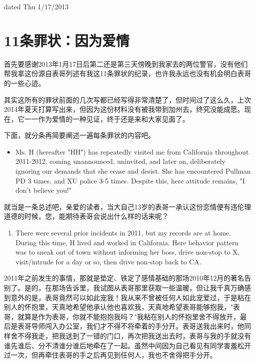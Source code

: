\documentclass[12pt]{book}
\begin{document}
dated Thu 1/17/2013

\section{11条罪状：因为爱情}
\label{sec-43-2}
首先要感谢2013年1月17日后第二还是第三天傍晚到我家去的两位警官，没有他们帮我拿这份源自表哥列述有我这11条罪状的纪录，也许我永远也没有机会明白表哥的一些心迹。

其实这所有的罪状前面的几次写都已经写得非常清楚了，但时间过了这么久，上次2014年夏天打算写出来，但因为这份材料没有被我带到加州去，终究没能成愿。现在，它一一作为爱情的一种见证，终于还是来和大家见面了。

下面，就分条再简要阐述一遍每条罪状的内容吧。

\begin{itemize}
\item Ms. H (hereafter "HH") has repeatedly visited me from California throughout 2011-2012, coming unannounced, uninvited, and later on, deliberately ignoring our demands that she cease and desist. She has encountered Pullman PD 3 times, and XU police 3-5 times. Despite this, here attitude remains, "I don't believe you!"
\end{itemize}

就当是一条总述吧，亲爱的读者，当大自己13岁的表哥一承认这份恋情便有违伦理道德的时候，您，能期待表哥会说出什么样的话来呢？

\begin{enumerate}
\item There were several prior incidents in 2011, but my records are at home. During this time, H lived and worked in California. Here behavior pattern was to sneak out of town without informing her boss, drive non-stop to X, visit/intrude for a day or so, then drive non-stop back to CA.
\end{enumerate}

2011年之前发生的事情，那就是垫定、铁定了感情基础的那场2010年12月的著名告别了。是的，在那场告诉里，我试图从表哥那里获取一些温暖，但让我千真万确感到意外的是，表哥竟然可以如此宠我！我从来不曾被任何人如此宠爱过，于是粘在别人的怀抱里，天真地希望他承认他也喜欢我，天真地希望表哥能够抱我，"表哥，就算是作为表哥，你就不能抱抱我吗？"我粘在别人的怀抱里舍不得放开，最后是表哥导师闯入办公室，我们才不得不将牵着的手分开。表哥送我出来时，他同样舍不得我走，把我送到了一错的门口，再次把我送出去时，表哥与我的手就没有谁先谁后、分不清谁分谁后地牵在了一起。虽然中间因为自己看见有同学害羞松开过一次，但再牵住表哥的手之后再见到任何人，我也不舍得把手分开。
\end{document}

